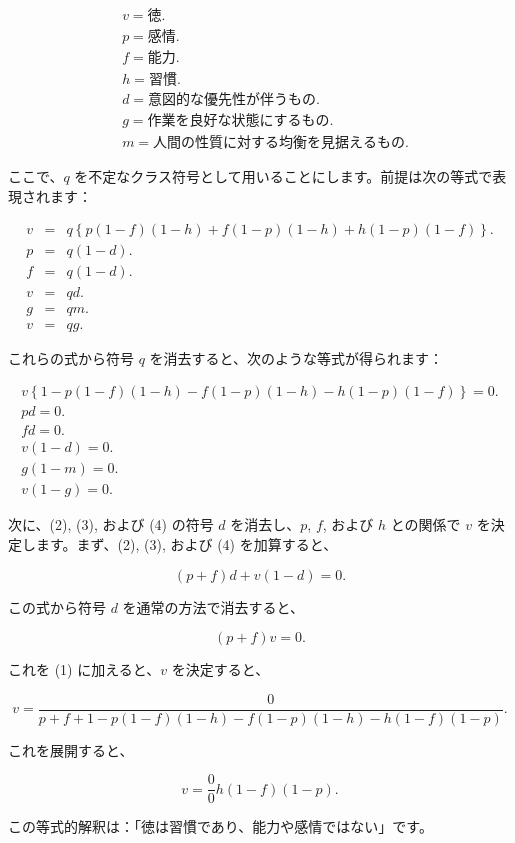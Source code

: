 \documentclass[a4paper,11pt,openany]{ltjsbook}
\begin{document}
\[
\begin{array}{cccccc}
& v = 徳. \\
& p = 感情. \\
& f = 能力. \\
& h = 習慣. \\
& d = 意図的な優先性が伴うもの. \\
& g = 作業を良好な状態にするもの. \\
& m = 人間の性質に対する均衡を見据えるもの.
\end{array}
\]

ここで、$q$ を不定なクラス符号として用いることにします。前提は次の等式で表現されます：

\begin{eqnarray*}
v &=& q \left\{ p (1 - f) (1 - h) + f (1 - p) (1 - h) + h (1 - p) (1 - f) \right\}. \\
p &=& q (1 - d). \\
f &=& q (1 - d). \\
v &=& qd. \\
g &=& qm. \\
v &=& qg.
\end{eqnarray*}

これらの式から符号 $q$ を消去すると、次のような等式が得られます：

\begin{eqnarray}
v \left\{ 1 - p (1 - f) (1 - h) - f (1 - p) (1 - h) - h (1 - p) (1 - f) \right\} = 0. \\
pd = 0. \\
fd = 0. \\
v (1 - d) = 0. \\
g (1 - m) = 0. \\
v (1 - g) = 0.
\end{eqnarray}

次に、(2), (3), および (4) の符号 $d$ を消去し、$p$, $f$, および $h$ との関係で $v$ を決定します。まず、(2), (3), および (4) を加算すると、

\[
(p + f)d + v(1 - d) = 0.
\]

この式から符号 $d$ を通常の方法で消去すると、

\[
(p + f)v = 0.
\]

これを (1) に加えると、$v$ を決定すると、

\[
v = \frac{0}{p + f + 1 - p(1 - f)(1 - h) - f(1 - p)(1 - h) - h(1 - f)(1 - p)}.
\]

これを展開すると、

\[
v = \frac{0}{0}h (1 - f) (1 - p).
\]

この等式的解釈は：「徳は習慣であり、能力や感情ではない」です。
\end{document}
